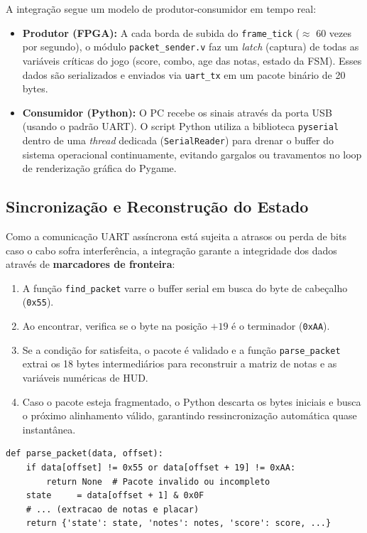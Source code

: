 \documentclass[12pt,a4paper]{article}
\begin{document}
A integração segue um modelo de produtor-consumidor em tempo real:
\begin{itemize}
    \item \textbf{Produtor (FPGA):} A cada borda de subida do \texttt{frame\_tick} ($\approx$ 60 vezes por segundo), o módulo \texttt{packet\_sender.v} faz um \emph{latch} (captura) de todas as variáveis críticas do jogo (score, combo, age das notas, estado da FSM). Esses dados são serializados e enviados via \texttt{uart\_tx} em um pacote binário de 20 bytes.
    \item \textbf{Consumidor (Python):} O PC recebe os sinais através da porta USB (usando o padrão UART). O script Python utiliza a biblioteca \texttt{pyserial} dentro de uma \emph{thread} dedicada (\texttt{SerialReader}) para drenar o buffer do sistema operacional continuamente, evitando gargalos ou travamentos no loop de renderização gráfica do Pygame.
\end{itemize}

\subsection{Sincronização e Reconstrução do Estado}

Como a comunicação UART assíncrona está sujeita a atrasos ou perda de bits caso o cabo sofra interferência, a integração garante a integridade dos dados através de \textbf{marcadores de fronteira}:
\begin{enumerate}
    \item A função \texttt{find\_packet} varre o buffer serial em busca do byte de cabeçalho (\texttt{0x55}).
    \item Ao encontrar, verifica se o byte na posição $+19$ é o terminador (\texttt{0xAA}).
    \item Se a condição for satisfeita, o pacote é validado e a função \texttt{parse\_packet} extrai os 18 bytes intermediários para reconstruir a matriz de notas e as variáveis numéricas de HUD.
    \item Caso o pacote esteja fragmentado, o Python descarta os bytes iniciais e busca o próximo alinhamento válido, garantindo ressincronização automática quase instantânea.
\end{enumerate}

\begin{lstlisting}[style=python, caption={Trecho do Parser verificando a integridade do pacote UART.}]
def parse_packet(data, offset):
    if data[offset] != 0x55 or data[offset + 19] != 0xAA:
        return None  # Pacote invalido ou incompleto
    state     = data[offset + 1] & 0x0F
    # ... (extracao de notas e placar)
    return {'state': state, 'notes': notes, 'score': score, ...}
\end{lstlisting}
\end{document}
